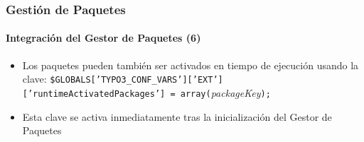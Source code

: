 \begin{frame}[fragile]
	\frametitle{Gestión de Paquetes}
	\framesubtitle{Integración del Gestor de Paquetes (6)}

	\lstset{
		basicstyle=\smaller\ttfamily
	}

	\begin{itemize}
		\item Los paquetes pueden también ser activados en tiempo de ejecución usando la clave:
			\smaller\texttt{\$GLOBALS['TYPO3\_CONF\_VARS']['EXT']['runtimeActivatedPackages'] = array(}\space\textit{packageKey}\space\texttt{);}\normalsize

		\item Esta clave se activa inmediatamente tras la inicialización del Gestor de Paquetes

	\end{itemize}

\end{frame}



